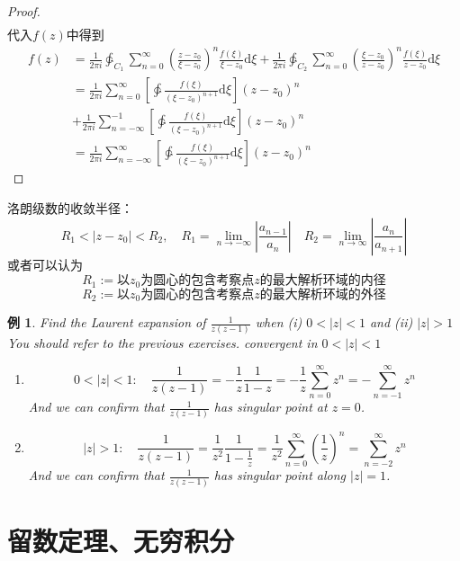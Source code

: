 \documentclass[10pt, a4paper, oneside]{ctexbook}
\newtheorem{example}[theorem]{例}
\def\D{\mathrm{d}}
\newcommand{\F}[1][z]
{\ensuremath{f(#1)}}
\begin{document}
\begin{proof}
\begin{align*}
    \end{align*}
    代入$\F$中得到
    \begin{align*}
        \F&=\frac{1}{2\pi i} \ointctrclockwise_{C_1} \sum_{n=0}^\infty  \left(\frac{z-z_0}{\xi-z_0}\right)^n  \frac{\F[\xi]}{\xi-z_0} \D \xi 
        + \frac{1}{2\pi i} \ointctrclockwise_{C_2} \sum_{n=0}^\infty \left(\frac{\xi-z_0}{z-z_0}\right)^n  \frac{\F[\xi]}{z-z_0} \D \xi\\
        &= \frac{1}{2\pi i}  \sum_{n=0}^\infty \left[\ointctrclockwise \frac{\F[\xi]}{(\xi-z_0)^{n+1}}\D \xi \right](z-z_0)^n \\
        & +\frac{1}{2\pi i}  \sum_{n=-\infty}^{-1} \left[\ointctrclockwise \frac{\F[\xi]}{(\xi-z_0)^{n+1}}\D \xi\right](z-z_0)^n  \\
        &= \frac{1}{2\pi i}  \sum_{n=-\infty}^\infty \left[\ointctrclockwise \frac{\F[\xi]}{(\xi-z_0)^{n+1}}\D \xi \right](z-z_0)^n
    \end{align*}
\end{proof}
洛朗级数的收敛半径：
$$
R_1<|z-z_0|<R_2,\quad R_1=\lim_{n\to -\infty} \left| \frac{a_{n-1}}{a_n} \right|\quad R_2=\lim_{n \to \infty} \left| \frac{a_n}{a_{n+1}} \right|
$$
或者可以认为
$$R_1 := \text{以$z_0$为圆心的包含考察点$z$的最大解析环域的内径}$$
$$R_2 := \text{以$z_0$为圆心的包含考察点$z$的最大解析环域的外径}$$
\begin{example}
    Find the Laurent expansion of $\frac{1}{z(z-1)}$ when (i) $0<|z|<1$ and (ii) $|z|>1$ You should refer to the previous exercises. convergent in $0<|z|<1$
    \begin{enumerate}
        \item $$0<|z|<1: \quad \frac{1}{z(z-1)}=-\frac{1}{z} \frac{1}{1-z}=-\frac{1}{z} \sum_{n=0}^{\infty} z^{n}=-\sum_{n=-1}^{\infty} z^{n}$$ And we can confirm that $\frac{1}{z(z-1)}$ has singular point at $z=0$.
        \item $$|z|>1:\quad \frac{1}{z(z-1)}=\frac{1}{z^{2}} \frac{1}{1-\frac{1}{z}}=\frac{1}{z^{2}} \sum_{n=0}^{\infty}\left(\frac{1}{z}\right)^{n}=\sum_{n=-2}^{\infty} z^{n}$$ And we can confirm that $\frac{1}{z(z-1)}$ has singular point along $|z|=1$.
    \end{enumerate}
\end{example}
\chapter{留数定理、无穷积分}
\end{document}
